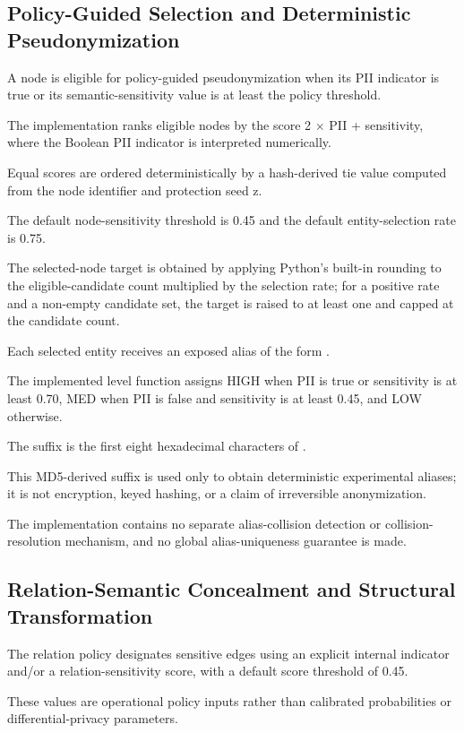 \documentclass[preprint,12pt]{elsarticle}
\begin{document}
\subsection{Policy-Guided Selection and Deterministic Pseudonymization}
A node is eligible for policy-guided pseudonymization when its PII indicator is true or its semantic-sensitivity value is at least the policy threshold.

The implementation ranks eligible nodes by the score 2 $\times$ PII + sensitivity, where the Boolean PII indicator is interpreted numerically.

Equal scores are ordered deterministically by a hash-derived tie value computed from the node identifier and protection seed z.

The default node-sensitivity threshold is 0.45 and the default entity-selection rate is 0.75.

The selected-node target is obtained by applying Python's built-in rounding to the eligible-candidate count multiplied by the selection rate; for a positive rate and a non-empty candidate set, the target is raised to at least one and capped at the candidate count.

Each selected entity receives an exposed alias of the form .

The implemented level function assigns HIGH when PII is true or sensitivity is at least 0.70, MED when PII is false and sensitivity is at least 0.45, and LOW otherwise.

The suffix is the first eight hexadecimal characters of .

This MD5-derived suffix is used only to obtain deterministic experimental aliases; it is not encryption, keyed hashing, or a claim of irreversible anonymization.

The implementation contains no separate alias-collision detection or collision-resolution mechanism, and no global alias-uniqueness guarantee is made.

\subsection{Relation-Semantic Concealment and Structural Transformation}
The relation policy designates sensitive edges using an explicit internal indicator and/or a relation-sensitivity score, with a default score threshold of 0.45.

These values are operational policy inputs rather than calibrated probabilities or differential-privacy parameters.
\end{document}
